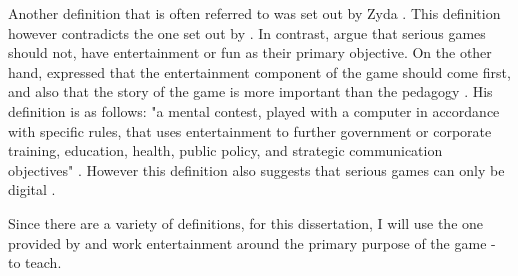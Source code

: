 \documentclass[a4paper,11.5pt]{report}
\numberwithin{figure}{section}
\numberwithin{table}{section}
\numberwithin{equation}{section}
\numberwithin{equation}{section}
\begin{document}
Another definition that is often referred to was set out by Zyda \citep[see][]{Johann2015}. This definition however contradicts the one set out by \citeauthor{Michael2005} \citep{Johann2015}. In contrast, \citeauthor{Michael2005} argue that serious games should not, have entertainment or fun as their primary objective. On the other hand, \citeauthor{Zyda2005} expressed that the entertainment component of the game should come first, and also that the story of the game is more important than the pedagogy \citep{Zyda2005}. His definition is as follows: "a mental contest, played with a computer in accordance with specific rules, that uses entertainment to further government or corporate training, education, health, public policy, and strategic communication objectives" \citep{Zyda2005}. However this definition also suggests that serious games can only be digital \citep{Jean}. 

Since there are a variety of definitions, for this dissertation, I will use the one provided by \citeauthor{abt1970} and work entertainment around the primary purpose of the game - to teach.








\end{document}
